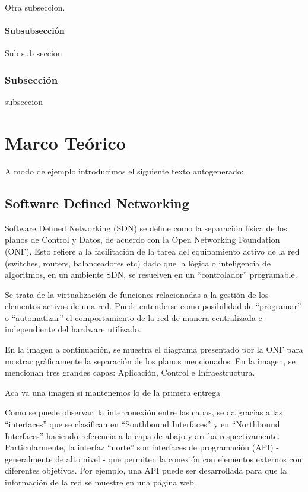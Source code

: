 \documentclass[12pt,a4paper,oneside]{book}
\begin{document}
Otra subseccion.


\subsubsection{Subsubsección}

Sub sub seccion

\subsection{Subsección}

subseccion

\chapter{Marco Teórico} 
\label{marcoteorico} %

A modo de ejemplo introducimos el siguiente texto autogenerado:



\section{Software Defined Networking}
\label{marco_sdn}


Software Defined Networking (SDN) se define como la separación física de los planos de Control y Datos, de acuerdo con la Open Networking Foundation (ONF). Esto refiere a la facilitación de la tarea del equipamiento activo de la red (switches, routers, balanceadores etc) dado que la lógica o inteligencia de algoritmos, en un ambiente SDN, se resuelven en un “controlador” programable.

Se trata de la virtualización de funciones relacionadas a la gestión de los elementos activos de una red. Puede entenderse como posibilidad de “programar” o “automatizar” el comportamiento de la red de manera centralizada e independiente del hardware utilizado. 

En la imagen a continuación, se muestra el diagrama presentado por la ONF para mostrar gráficamente la separación de los planos mencionados. En la imagen, se mencionan tres grandes capas: Aplicación, Control e Infraestructura. 

Aca va una imagen si mantenemos lo de la primera entrega

Como se puede observar, la interconexión entre las capas, se da gracias a las “interfaces” que se clasifican en “Southbound Interfaces” y en “Northbound Interfaces” haciendo referencia a la capa de abajo y arriba respectivamente.
	Particularmente, la interfaz “norte” son interfaces de programación (API) - generalmente de alto nivel - que permiten la conexión con elementos externos con diferentes objetivos. Por ejemplo, una API puede ser desarrollada para que la información de la red se muestre en una página web.
	
\end{document}
